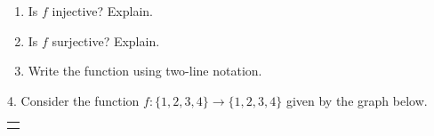 \documentclass[10pt,]{book}
\theoremstyle{plain}
\theoremstyle{definition}
\theoremstyle{definition}
\theoremstyle{definition}
\numberwithin{equation}{chapter}
\newlength{\panelmax}
\begin{document}
\begin{exerciselist}
\hypertarget{p-2176}{}%
\leavevmode%
\begin{enumerate}[label=(\alph*)]
\item\hypertarget{li-396}{}\hypertarget{p-2177}{}%
Is \(f\) injective? Explain.%
\item\hypertarget{li-397}{}\hypertarget{p-2178}{}%
Is \(f\) surjective? Explain.%
\item\hypertarget{li-398}{}\hypertarget{p-2179}{}%
Write the function using two-line notation.%
\end{enumerate}
%
\par\smallskip
\item[4.]\hypertarget{exercise-85}{}\hypertarget{p-2184}{}%
Consider the function \(f:\{1,2,3,4\} \to \{1,2,3,4\}\) given by the graph below.%
{%
\setlength{\panelmax}{0pt}
\ifdefined\panelboxAimage\else\newsavebox{\panelboxAimage}\fi%
\begin{lrbox}{\panelboxAimage}
\end{lrbox}
\ifdefined\phAimage\else\newlength{\phAimage}\fi%
\setlength{\phAimage}{\ht\panelboxAimage+\dp\panelboxAimage}
\settototalheight{\phAimage}{\usebox{\panelboxAimage}}
\setlength{\panelmax}{\maxof{\panelmax}{\phAimage}}
\leavevmode%
\setlength{\tabcolsep}{0\linewidth}
\par\medskip\noindent
\hspace*{0.3\linewidth}%
\begin{tabular}{@{}*{1}{c}@{}}
\begin{minipage}[c][\panelmax][t]{0.4\linewidth}\usebox{\panelboxAimage}\end{minipage}\end{tabular}\\
}%
\par

\end{exerciselist}
\end{document}
